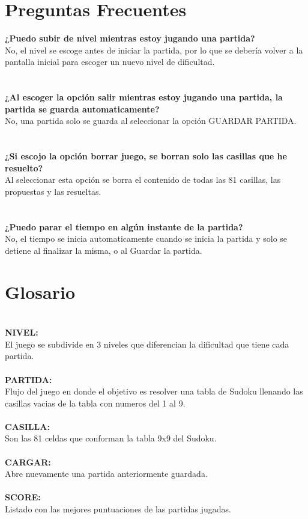\documentclass[12pt,oneside]{book}
\begin{document}




\chapter{Preguntas Frecuentes}

\begin{center}

\textbf{¿Puedo subir de nivel mientras estoy jugando una partida?} \\ No, el nivel se escoge antes de iniciar la partida, por lo que se debería volver a la pantalla inicial para escoger un nuevo nivel de dificultad.
\ \\ \ \\ \ \\

\textbf{¿Al escoger la opción salir mientras estoy jugando una partida, la partida se guarda automaticamente?} \\ No, una partida solo se guarda al seleccionar la opción GUARDAR PARTIDA.
\ \\ \ \\ \ \\

\textbf{¿Si escojo la opción borrar juego, se borran solo las casillas que he resuelto?} \\ Al seleccionar esta opción se borra el contenido de todas las 81 casillas, las propuestas y las resueltas.
\ \\ \ \\ \ \\

\textbf{¿Puedo parar el tiempo en algún instante de la partida?} \\ No, el tiempo se inicia automaticamente cuando se inicia la partida y solo se detiene al finalizar la misma, o al Guardar la partida.


\end{center}


\chapter{Glosario}
\ \\
\textbf{NIVEL:} \\ El juego se subdivide en 3 niveles que diferencian la dificultad que tiene cada partida.
\ \\ \ \\ 
\textbf{PARTIDA:} \\ Flujo del juego en donde el objetivo es resolver una tabla de Sudoku llenando las casillas vacias de la tabla con numeros del 1 al 9.
\ \\ \ \\ 
\textbf{CASILLA:} \\Son las 81 celdas que conforman la tabla 9x9 del Sudoku.
\ \\ \ \\ 
\textbf{CARGAR:} \\ Abre nuevamente una partida anteriormente guardada.
\ \\ \ \\
\textbf{SCORE:} \\ Listado con las mejores puntuaciones de las partidas jugadas.
\end{document}

